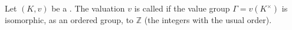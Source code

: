 \begin{definition} \label{definition:discrete_valuation_on_a_field}
Let $(K, v)$ be a . The valuation $v$ is called  if the value group $\Gamma = v(K^\times)$ is isomorphic, as an ordered group, to $\mathbb{Z}$ (the integers with the usual order).
\end{definition}
